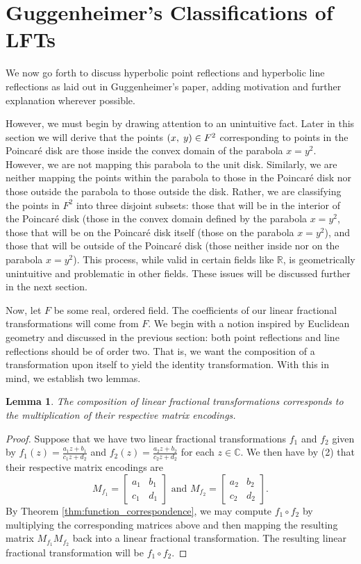 \documentclass[12pt]{article}
\newcommand{\R}{\mathbb{R}}
\newcommand{\C}{\mathbb{C}}
\newcommand{\lftmat}[4]{\begin{bmatrix} {#1} & {#2} \\ {#3} & {#4} \end{bmatrix}}
\newcommand{\ttc}{, \hspace{1mm}}
\newcommand{\poincare}{Poincar\'{e} }
\theoremstyle{plain}
\newtheorem{lemma}[theorem]{Lemma}
\theoremstyle{definition}
\begin{document}
\section{Guggenheimer's Classifications of LFTs}

\hspace{10mm} We now go forth to discuss hyperbolic point reflections and hyperbolic line reflections as laid out in Guggenheimer's paper, adding motivation and further explanation wherever possible. 

However, we must begin by drawing attention to an unintuitive fact. Later in this section we will derive that the points $(x\ttc y) \in F^2$ corresponding to points in the \poincare disk are those inside the convex domain of the parabola $x = y^2$. However, we are not mapping this parabola to the unit disk. Similarly, we are neither mapping the points within the parabola to those in the \poincare disk nor those outside the parabola to those outside the disk. Rather, we are classifying the points in $F^2$ into three disjoint subsets: those that will be in the interior of the \poincare disk (those in the convex domain defined by the parabola $x = y^2$, those that will be on the \poincare disk itself (those on the parabola $x = y^2$), and those that will be outside of the \poincare disk (those neither inside nor on the parabola $x = y^2$). This process, while valid in certain fields like $\R$, is geometrically unintuitive and problematic in other fields. These issues will be discussed further in the next section. 

Now, let $F$ be some real, ordered field. The coefficients of our linear fractional transformations will come from $F$. We begin with a notion inspired by Euclidean geometry and discussed in the previous section: both point reflections and line reflections should be of order two. That is, we want the composition of a transformation upon itself to yield the identity transformation. With this in mind, we establish two lemmas.

\begin{lemma} 
	The composition of linear fractional transformations corresponds to the multiplication of their respective matrix encodings.
\end{lemma}

\begin{proof} 
	Suppose that we have two linear fractional transformations $f_1$ and $f_2$ given by $f_1(z) = \frac{a_1z+b_1}{c_1z+d_2}$ and $f_2(z) = \frac{a_2z+b_2}{c_2z+d_2}$ for each $z \in \C$. We then have by (2) that their respective matrix encodings are 
\[ 
	M_{f_1} = \lftmat{a_1}{b_1}{c_1}{d_1} 
	\text{ and } 
	M_{f_2} =  \lftmat{a_2}{b_2}{c_2}{d_2}. 
\] 
	By Theorem \ref{thm:function_correspondence}, we may compute $f_1\circ f_2$ by multiplying the corresponding matrices above and then mapping the resulting matrix $M_{f_1}M_{f_2}$ back into a linear fractional transformation. The resulting linear fractional transformation will be $f_1\circ f_2$.
\end{proof}	
	
\end{document}

